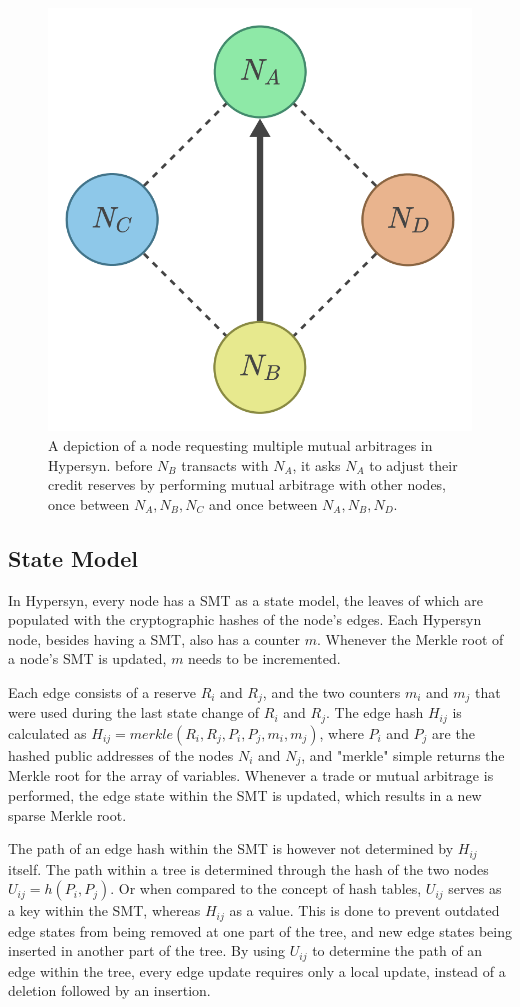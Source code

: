 \documentclass{article}
\begin{document}
\begin{figure}[h]
\centering\includegraphics[width=0.3\linewidth]{figures/multiple_mutual_arbitrage.png}
\caption{A depiction of a node requesting multiple mutual arbitrages in Hypersyn. before $N_B$ transacts with $N_A$, it asks $N_A$ to adjust their credit reserves by performing mutual arbitrage with other nodes, once between ${N_A, N_B, N_C}$ and once between ${N_A, N_B, N_D}$.
}
\label{fig:multiple_mutual_arbitrage}
\end{figure}



\subsection{State Model}
\label{ss: state model}
In Hypersyn, every node has a SMT as a state model, the leaves of which are populated with the cryptographic hashes of the node's edges. Each Hypersyn node, besides having a SMT, also has a counter $m$. Whenever the Merkle root of a node's SMT is updated, $m$ needs to be incremented.

Each edge consists of a reserve $R_i$ and $R_j$, and the two counters $m_i$ and $m_j$ that were used during the last state change of $R_i$ and $R_j$. The edge hash $H_{ij}$ is calculated as $H_{ij} = merkle(R_i,R_j, P_i,P_j, m_i,m_j)$, where $P_i$ and $P_j$ are the hashed public addresses of the nodes $N_i$ and $N_j$, and "merkle" simple returns the Merkle root for the array of variables. Whenever a trade or mutual arbitrage is performed, the edge state within the SMT is updated, which results in a new sparse Merkle root.

The path of an edge hash within the SMT is however not determined by $H_{ij}$ itself. The path within a tree is determined through the hash of the two nodes $U_{ij} = h(P_i,P_j)$. Or when compared to the concept of hash tables, $U_{ij}$ serves as a key within the SMT, whereas $H_{ij}$ as a value. This is done to prevent outdated edge states from being removed at one part of the tree, and new edge states being inserted in another part of the tree. By using $U_{ij}$ to determine the path of an edge within the tree, every edge update requires only a local update, instead of a deletion followed by an insertion.
\end{document}
